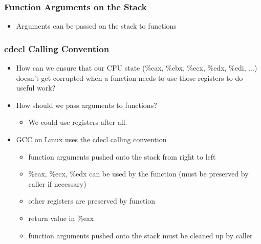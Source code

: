 \documentclass[11pt,xcolor=dvipsnames]{beamer}
\begin{document}
\begin{frame}[fragile,t]
\frametitle{Function Arguments on the Stack}
\begin{itemize}
  \item Arguments can be passed on the stack to functions
\end{itemize}
\end{frame}

\begin{frame}[fragile,t]
\frametitle{{\ttfamily cdecl} Calling Convention}
\begin{itemize}
  \item How can we ensure that our CPU state ({\ttfamily \%eax, \%ebx, \%ecx, \%edx, \%edi, ...}) doesn't get corrupted when a function needs to use those registers to do useful work?
  \pause
  \item How should we pass arguments to functions?
  \begin{itemize}
    \item We could use registers after all.
  \end{itemize}
  \pause
  \item GCC on Linux uses the {\ttfamily cdecl} calling convention
  \begin{itemize}
     \item function arguments pushed onto the stack from right to left
     \item {\ttfamily \%eax, \%ecx, \%edx} can be used by the function (must be preserved by caller if necessary)
     \item other registers are preserved by function
     \item return value in {\ttfamily \%eax}
     \item function arguments pushed onto the stack must be cleaned up by caller
  \end{itemize}
\end{itemize}
\end{frame}
\end{document}
